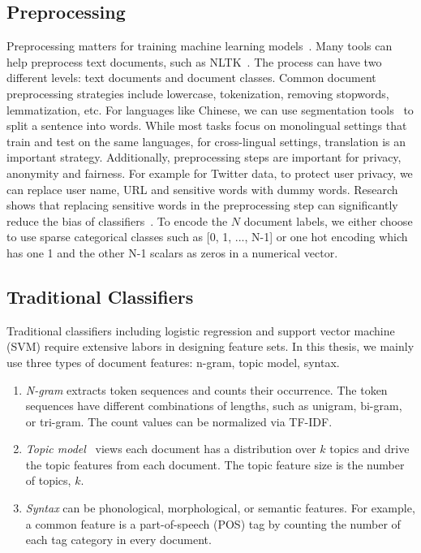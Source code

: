 \subsection{Preprocessing}
Preprocessing matters for training machine learning models~\cite{camacho2018role,huang2019matters}.
Many tools can help preprocess text documents, such as NLTK~\cite{bird2004nltk}.
The process can have two different levels: text documents and document classes.
Common document preprocessing strategies include lowercase, tokenization, removing stopwords, lemmatization, etc.
For languages like Chinese, we can use segmentation tools~\cite{sun2012jieba} to split a sentence into words.
While most tasks focus on monolingual settings that train and test on the same languages, for cross-lingual settings, translation is an important strategy.
Additionally, preprocessing steps are important for privacy, anonymity and fairness. 
For example for Twitter data, to protect user privacy, we can replace user name, URL and sensitive words with dummy words. 
Research shows that replacing sensitive words in the preprocessing step can significantly reduce the bias of classifiers~\cite{dixon2018measuring}.
To encode the $N$ document labels, we either choose to use sparse categorical classes such as [0, 1, ..., N-1] or one hot encoding which has one 1 and the other N-1 scalars as zeros in a numerical vector. 


\subsection{Traditional Classifiers}

Traditional classifiers including logistic regression and support vector machine (SVM) require extensive labors in designing feature sets.
In this thesis, we mainly use three types of document features: n-gram, topic model, syntax.

\begin{enumerate}
\item \textit{N-gram} extracts token sequences and counts their occurrence. The token sequences have different combinations of lengths, such as unigram, bi-gram, or tri-gram. The count values can be normalized via TF-IDF.  
\item \textit{Topic model}~\cite{blei2003latent} views each document has a distribution over $k$ topics and drive the topic features from each document. The topic feature size is the number of topics, $k$. 
\item \textit{Syntax} can be phonological, morphological, or semantic features. For example, a common feature is a part-of-speech (POS) tag by counting the number of each tag category in every document. 
\end{enumerate}  


